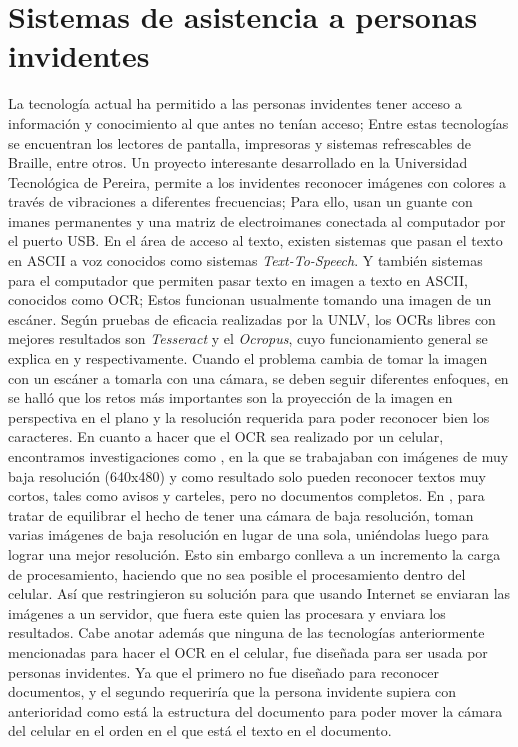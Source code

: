 \documentclass[a4paper, 11pt, oneside]{article}
\begin{document}
	\section{Sistemas de asistencia a personas invidentes}
	La tecnología actual ha permitido a las personas invidentes tener acceso a información
	y conocimiento al que antes no tenían acceso; Entre estas tecnologías se encuentran los
	lectores de pantalla, impresoras y sistemas refrescables de Braille, entre otros.
	Un proyecto interesante desarrollado en la Universidad Tecnológica de Pereira, permite
	a los invidentes reconocer imágenes con colores a través de vibraciones a diferentes
	frecuencias\cite{iris04}; Para ello, usan un guante con imanes permanentes y una matriz
	de electroimanes conectada al computador por el puerto USB.
	En el área de acceso al texto, existen sistemas que pasan el texto en ASCII a voz
	conocidos como sistemas \textit{Text-To-Speech}. Y también sistemas para el computador
	que permiten pasar texto en imagen a texto en ASCII, conocidos como OCR; Estos funcionan
	usualmente tomando una imagen de un escáner. Según pruebas de eficacia realizadas por
	la UNLV, los OCRs libres con mejores resultados son	\textit{Tesseract} y el 
	\textit{Ocropus}, cuyo funcionamiento general se explica en \cite{tesseract1} y
	\cite{ocropus1} respectivamente.\newline
	Cuando el problema cambia de tomar la imagen con un escáner a tomarla con una cámara,
	se deben seguir diferentes enfoques, en\cite{doc_analysis3} se halló que los retos más
	importantes son la proyección de la imagen en perspectiva en el plano y la resolución
	requerida para poder reconocer bien los caracteres.
	En cuanto a hacer que el OCR sea realizado por un celular, encontramos investigaciones
	como \cite{mob_smallpic}, en la que se trabajaban con imágenes de muy baja resolución
	(640x480) y como resultado solo pueden reconocer textos muy cortos, tales como avisos
	y carteles,	pero no documentos completos.
	En \cite{mob_withpc}, para tratar de equilibrar el hecho de tener una cámara de baja
	resolución, toman varias imágenes de baja resolución en lugar de una sola, uniéndolas
	luego para lograr una mejor resolución. Esto sin embargo conlleva a un incremento la
	carga de procesamiento, haciendo que no sea posible el procesamiento dentro del celular.
	Así que restringieron su solución para que usando Internet se enviaran las imágenes a un
	servidor, que fuera este quien las procesara y enviara los resultados.\newline
	Cabe anotar además que ninguna de las tecnologías anteriormente mencionadas para hacer
	el OCR en el celular, fue diseñada para ser usada por personas invidentes. Ya que el 
	primero no fue diseñado para reconocer documentos, y el segundo requeriría que la persona
	invidente supiera con anterioridad como está la estructura del documento para poder mover
	la cámara del celular en el orden en el que está el texto en el documento.\newline
\end{document}
